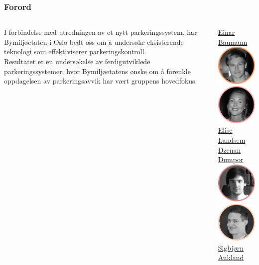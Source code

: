 \documentclass[xetex]{beamer}
\begin{document}
\begin{frame}
  \frametitle{Forord}
  \begin{columns}[]
    \begin{column}{0.5\textwidth}
	I forbindelse med utredningen av et \alert{nytt parkeringssystem}, har Bymiljøetaten i Oslo bedt oss om å undersøke eksisterende teknologi som \alert{effektiviserer parkeringskontroll}. \\ [1em]

	Resultatet er en undersøkelse av ferdigutviklede parkeringssystemer, hvor Bymiljøetatens ønske om å \alert{forenkle} oppdagelsen av parkeringsavvik har vært gruppens hovedfokus.
    \end{column}
    \begin{column}{0.5\textwidth}
      \centering
      \hspace{6em}\underline{{\;\tiny Einar Baumann}\includegraphics[scale=1.0]{grafikk/portretter/einar.pdf}}\\ [-1em]
      \hspace{-6em}\underline{\includegraphics[scale=1.0]{grafikk/portretter/elise.pdf}{\tiny Elise Landsem\;}}\\ [-1em]
      \hspace{5.7em}\underline{{\;\tiny Dzenan Dumpor}\includegraphics[scale=1.0]{grafikk/portretter/dzenan.pdf}}\\ [-1em]
      \hspace{-5.0em}\underline{\includegraphics[scale=1.0]{grafikk/portretter/sigbjorn.pdf}{\tiny Sigbjørn Aukland\;}}\\ [-1em]

\end{column}
\end{columns}
\end{frame}
\end{document}
